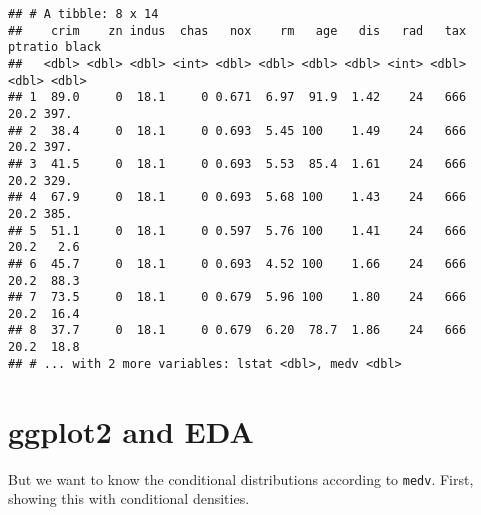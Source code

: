 \documentclass[]{book}
\newenvironment{Shaded}{\begin{snugshade}}{\end{snugshade}}
\newcommand{\KeywordTok}[1]{\textcolor[rgb]{0.13,0.29,0.53}{\textbf{#1}}}
\newcommand{\DataTypeTok}[1]{\textcolor[rgb]{0.13,0.29,0.53}{#1}}
\newcommand{\DecValTok}[1]{\textcolor[rgb]{0.00,0.00,0.81}{#1}}
\newcommand{\StringTok}[1]{\textcolor[rgb]{0.31,0.60,0.02}{#1}}
\newcommand{\OperatorTok}[1]{\textcolor[rgb]{0.81,0.36,0.00}{\textbf{#1}}}
\newcommand{\NormalTok}[1]{#1}
\begin{document}
\begin{verbatim}
## # A tibble: 8 x 14
##    crim    zn indus  chas   nox    rm   age   dis   rad   tax ptratio black
##   <dbl> <dbl> <dbl> <int> <dbl> <dbl> <dbl> <dbl> <int> <dbl>   <dbl> <dbl>
## 1  89.0     0  18.1     0 0.671  6.97  91.9  1.42    24   666    20.2 397. 
## 2  38.4     0  18.1     0 0.693  5.45 100    1.49    24   666    20.2 397. 
## 3  41.5     0  18.1     0 0.693  5.53  85.4  1.61    24   666    20.2 329. 
## 4  67.9     0  18.1     0 0.693  5.68 100    1.43    24   666    20.2 385. 
## 5  51.1     0  18.1     0 0.597  5.76 100    1.41    24   666    20.2   2.6
## 6  45.7     0  18.1     0 0.693  4.52 100    1.66    24   666    20.2  88.3
## 7  73.5     0  18.1     0 0.679  5.96 100    1.80    24   666    20.2  16.4
## 8  37.7     0  18.1     0 0.679  6.20  78.7  1.86    24   666    20.2  18.8
## # ... with 2 more variables: lstat <dbl>, medv <dbl>
\end{verbatim}

\section{ggplot2 and EDA}\label{ggplot2-and-eda}

But we want to know the conditional distributions according to
\texttt{medv}. First, showing this with conditional densities.

\begin{Shaded}
\end{Shaded}
\end{document}
